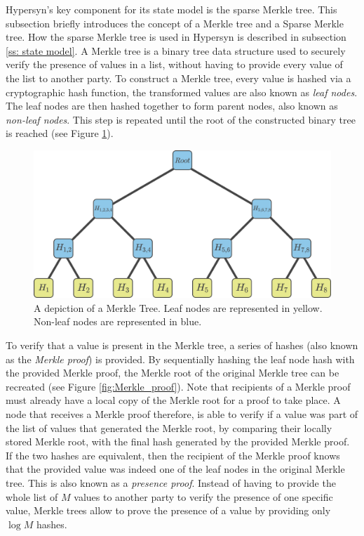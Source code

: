 \documentclass{article}
\begin{document}
Hypersyn's key component for its state model is the sparse Merkle tree. This subsection briefly introduces the concept of a Merkle tree and a Sparse Merkle tree. How the sparse Merkle tree is used in Hypersyn is described in subsection \ref{ss: state model}. A Merkle tree is a binary tree data structure used to securely verify the presence of values in a list, without having to provide every value of the list to another party. To construct a Merkle tree, every value is hashed via a cryptographic hash function, the transformed values are also known as \textit{leaf nodes}. The leaf nodes are then hashed together to form parent nodes, also known as \textit{non-leaf nodes}. This step is repeated until the root of the constructed binary tree is reached (see Figure \ref{fig:Merkle_tree}).

\begin{figure}[h]
\centering\includegraphics[width=0.5\linewidth]{figures/merkle_tree.png}
\caption{A depiction of a Merkle Tree. Leaf nodes are represented in yellow. Non-leaf nodes are represented in blue.}
\label{fig:Merkle_tree}
\end{figure}

To verify that a value is present in the Merkle tree, a series of hashes (also known as the \textit{Merkle proof}) is provided. By sequentially hashing the leaf node hash with the provided Merkle proof, the Merkle root of the original Merkle tree can be recreated (see Figure \ref{fig:Merkle_proof}). Note that recipients of a Merkle proof must already have a local copy of the Merkle root for a proof to take place. A node that receives a Merkle proof therefore, is able to verify if a value was part of the list of values that generated the Merkle root, by comparing their locally stored Merkle root, with the final hash generated by the provided Merkle proof. If the two hashes are equivalent, then the recipient of the Merkle proof knows that the provided value was indeed one of the leaf nodes in the original Merkle tree. This is also known as a \textit{presence proof}. Instead of having to provide the whole list of $M$ values to another party to verify the presence of one specific value, Merkle trees allow to prove the presence of a value by providing only $\log{M}$ hashes.
\end{document}
